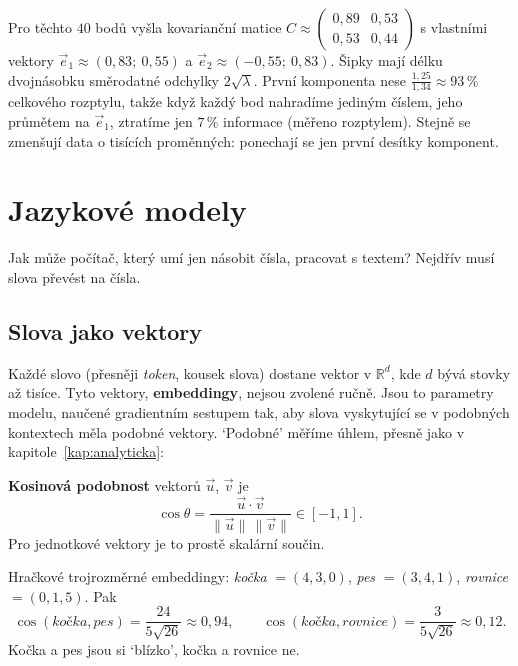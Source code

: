 Pro těchto $40$ bodů vyšla kovarianční matice $C\approx\begin{pmatrix} 0{,}89 & 0{,}53\\ 0{,}53 & 0{,}44\end{pmatrix}$ s vlastními vektory $\vec{e}_1\approx(0{,}83;\ 0{,}55)$ a $\vec{e}_2\approx(-0{,}55;\ 0{,}83)$. Šipky mají délku dvojnásobku směrodatné odchylky $2\sqrt{\lambda}$. První komponenta nese $\frac{1{,}25}{1{,}34}\approx 93\,\%$ celkového rozptylu, takže když každý bod nahradíme jediným číslem, jeho průmětem na $\vec{e}_1$, ztratíme jen $7\,\%$ informace (měřeno rozptylem). Stejně se zmenšují data o tisících proměnných: ponechají se jen první desítky komponent.

\section{Jazykové modely}

Jak může počítač, který umí jen násobit čísla, pracovat s textem? Nejdřív musí slova převést na čísla.

\subsection{Slova jako vektory}

Každé slovo (přesněji \textit{token}, kousek slova) dostane vektor v $\mathbb{R}^d$, kde $d$ bývá stovky až tisíce. Tyto vektory, \textbf{embeddingy}, nejsou zvolené ručně. Jsou to parametry modelu, naučené gradientním sestupem tak, aby slova vyskytující se v podobných kontextech měla podobné vektory. `Podobné' měříme úhlem, přesně jako v kapitole~\ref{kap:analyticka}:

\begin{definitionbox}
  \textbf{Kosinová podobnost} vektorů $\vec{u}$, $\vec{v}$ je
  \begin{equation*}
    \cos\theta = \frac{\vec{u}\cdot\vec{v}}{\|\vec{u}\|\,\|\vec{v}\|}\in[-1, 1].
  \end{equation*}
  Pro jednotkové vektory je to prostě skalární součin.
\end{definitionbox}

\begin{example}
  Hračkové trojrozměrné embeddingy: \textit{kočka} $= (4, 3, 0)$, \textit{pes} $= (3, 4, 1)$, \textit{rovnice} $= (0, 1, 5)$. Pak
  \begin{equation*}
    \cos(\textit{kočka}, \textit{pes}) = \frac{24}{5\sqrt{26}}\approx 0{,}94,\qquad\cos(\textit{kočka}, \textit{rovnice}) = \frac{3}{5\sqrt{26}}\approx 0{,}12.
  \end{equation*}
  Kočka a pes jsou si `blízko', kočka a rovnice ne.
\end{example}


